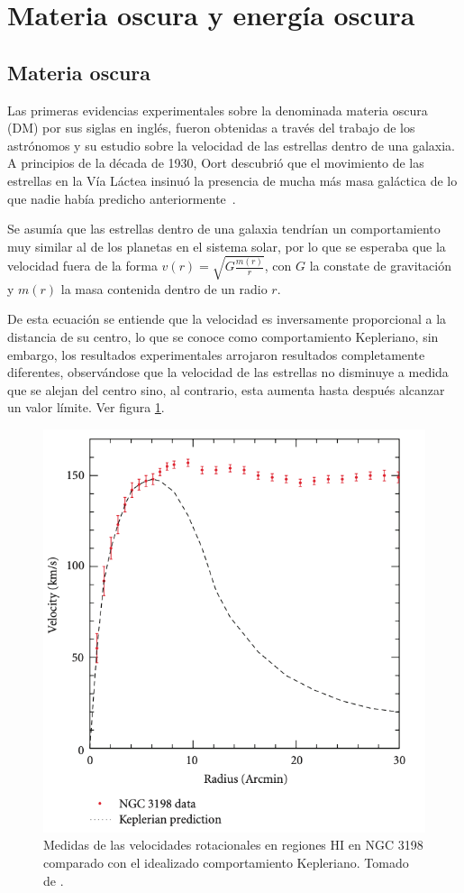 \documentclass[journal]{IEEEtran}
\begin{document}
 \section{Materia oscura y energía oscura}

\subsection{Materia oscura}

Las primeras evidencias experimentales sobre la denominada materia oscura (DM) por sus siglas en inglés, fueron obtenidas a través del trabajo de los astrónomos y su estudio sobre la velocidad de las estrellas dentro de una galaxia.
A principios de la década de 1930, Oort descubrió que el movimiento de las estrellas en la Vía Láctea insinuó la presencia de mucha más  masa galáctica de lo que nadie había predicho anteriormente~\cite{K. Garrett}.

Se asumía que las estrellas dentro de una galaxia tendrían un comportamiento muy similar al de los planetas en el sistema solar, por lo que se esperaba que la velocidad fuera de la forma $ v(r) = \sqrt{G\frac{m(r)}{r}}$, con $G$ la constate de gravitación y $m(r)$ la masa contenida dentro de un radio $r$. 

De esta ecuación se entiende que la velocidad es inversamente proporcional a la distancia de su centro, lo que se conoce como comportamiento Kepleriano, sin embargo, los resultados experimentales arrojaron resultados completamente diferentes, observándose que la velocidad de las estrellas no disminuye a medida que se alejan del centro sino, al contrario, esta aumenta hasta después alcanzar un valor límite. Ver figura \ref{Velocidades}.


\begin{figure}[!htb]
\centering
\includegraphics[width=\linewidth,height=8 cm]{velociad.png}
\caption{ Medidas de las velocidades rotacionales en regiones HI  en  NGC 3198 comparado con el idealizado comportamiento Kepleriano. Tomado de \hspace{.2cm}\cite{K.G. Begeman}.}
\label{Velocidades}
\end{figure}
\end{document}
